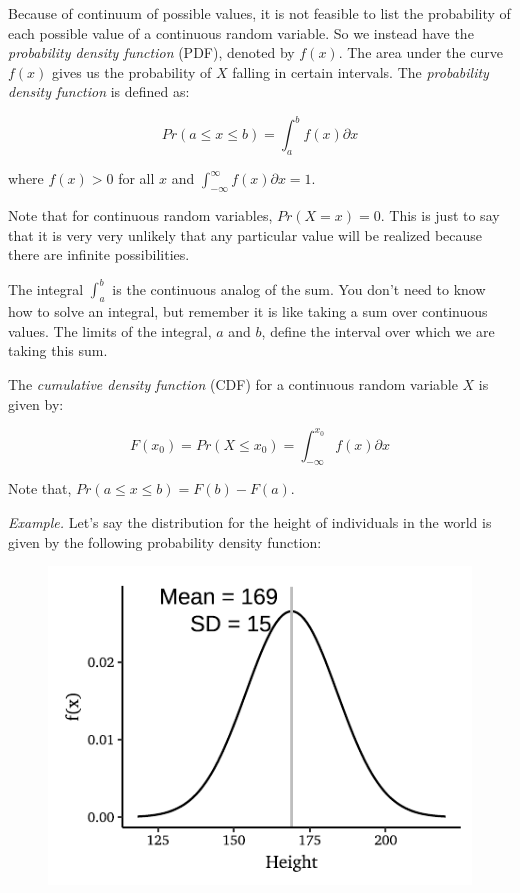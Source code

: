 \documentclass{./../../Latex/handout}
\begin{document}
Because of continuum of possible values, it is not feasible to list the probability of each possible value of a continuous random variable. So we instead have the \textit{probability density function} (PDF), denoted by $f(x)$. The area under the curve $f(x)$ gives us the probability of $X$ falling in certain intervals. The \textit{probability density function} is defined as:

$$ Pr(a \leq x \leq b) =  \int_{a}^{b} f(x) \partial x $$

where $f(x)>0$ for all $x$ and $\int_{-\infty}^{\infty} f(x) \partial x =1 $. 

Note that for continuous random variables, $Pr(X=x)=0$. This is just to say that it is very very unlikely that any particular value will be realized because there are infinite possibilities. 

The integral $\int^{b}_{a}$ is the continuous analog of the sum. You don't need to know how to solve an integral, but remember it is like taking a sum over continuous values. The limits of the integral, $a$ and $b$, define the interval over which we are taking this sum.

The \textit{cumulative density function} (CDF) for a continuous random variable $X$ is given by: 

$$ F(x_0) = Pr(X \leq x_0) = \int_{-\infty}^{x_0} f(x) \partial x$$

Note that, $ Pr(a \leq x \leq b) = F(b) - F(a) $. 

\textit{Example.} Let's say the distribution for the height of individuals in the world is given by the following probability density function: 

\begin{figure}[!h]
\centering
\includegraphics{./../../output/height_norm_pdf.pdf} \\
\end{figure}
\end{document}
